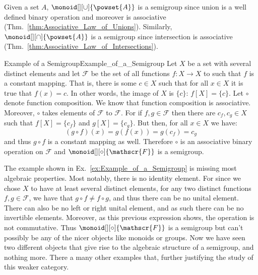         \begin{example}
            Given a set $A$, $\monoid[][\cup]{\powset{A}}$ is a semigroup
            since union is a well defined binary operation and moreover is
            associative (Thm.~\ref{thm:Associative_Law_of_Unions}). Similarly,
            $\monoid[][\cap]{\powset{A}}$ is a semigroup since intersection is
            associative (Thm.~\ref{thm:Associative_Law_of_Intersections}).
        \end{example}
        \begin{fexample}{Example of a Semigroup}{Example_of_a_Semigroup}
            Let $X$ be a set with several distinct elements and let $\mathscr{F}$
            be the set of all functions $f:X\rightarrow{X}$ to such that $f$ is
            a constant mapping. That is, there is some $c\in{X}$ such that for
            all $x\in{X}$ it is true that $f(x)=c$. In other words, the image of
            $X$ is $\{c\}$: $f[X]=\{c\}$. Let $\circ$ denote function
            composition. We know that function composition is associative.
            Moreover, $\circ$ takes elements of $\mathscr{F}$ to $\mathscr{F}$.
            For if $f,g\in\mathscr{F}$ then there are $c_{f},c_{g}\in{X}$ such
            that $f[X]=\{c_{f}\}$ and $g[X]=\{c_{g}\}$. But then, for all
            $x\in{X}$ we have:
            \begin{equation}
                (g\circ{f})(x)=g(f(x))=g(c_{f})=c_{g}
            \end{equation}
            and thus $g\circ{f}$ is a constant mapping as well. Therefore
            $\circ$ is an associative binary operation on $\mathscr{F}$ and
            $\monoid[][\circ]{\mathscr{F}}$ is a semigroup.
        \end{fexample}
        The example shown in Ex.~\ref{ex:Example_of_a_Semigroup} is missing most
        algebraic properties. Most notably, there is no identity element. For
        since we chose $X$ to have at least several distinct elements, for any
        two distinct functions $f,g\in\mathscr{F}$, we have that
        $g\circ{f}\ne{f}\circ{g}$, and thus there can be no unital element.
        There can also be no left or right unital element, and as such there can
        be no invertible elements. Moreover, as this previous expression shows,
        the operation is not commutative. Thus $\monoid[][\circ]{\mathscr{F}}$
        is a semigroup but can't possibly be any of the nicer objects like
        monoids or groups. Now we have seen two different objects that give rise
        to the algebraic structure of a semigroup, and nothing more. There a
        many other examples that, further justifying the study of this weaker
        category.
